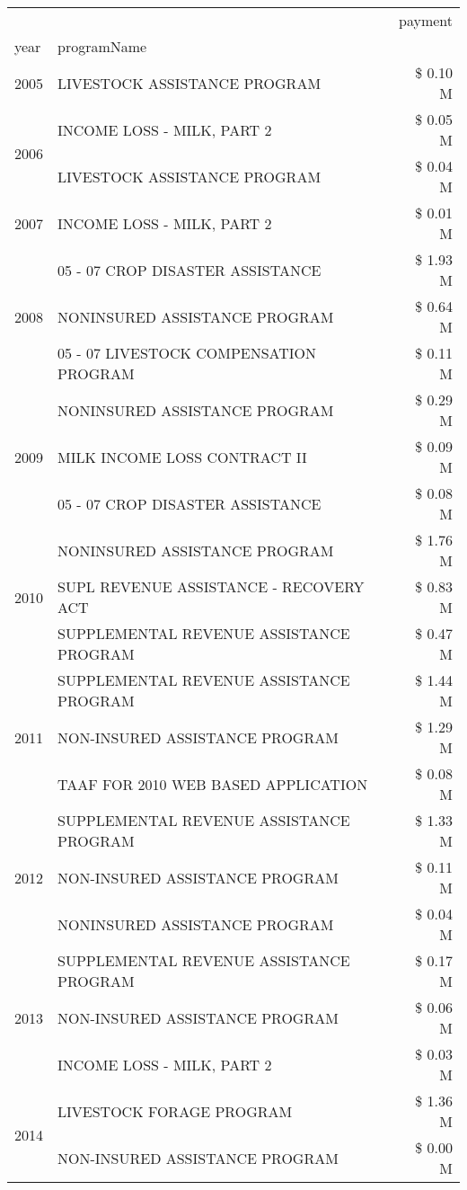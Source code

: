 \begin{tabular}{llr}
\toprule
 &  & payment \\
year & programName &  \\
\midrule
2005 & LIVESTOCK ASSISTANCE PROGRAM & \$ 0.10 M \\
\cline{1-3}
\multirow[t]{2}{*}{2006} & INCOME LOSS - MILK, PART 2 & \$ 0.05 M \\
 & LIVESTOCK ASSISTANCE PROGRAM & \$ 0.04 M \\
\cline{1-3}
2007 & INCOME LOSS - MILK, PART 2 & \$ 0.01 M \\
\cline{1-3}
\multirow[t]{3}{*}{2008} & 05 - 07 CROP DISASTER ASSISTANCE & \$ 1.93 M \\
 & NONINSURED ASSISTANCE PROGRAM & \$ 0.64 M \\
 & 05 - 07 LIVESTOCK COMPENSATION PROGRAM & \$ 0.11 M \\
\cline{1-3}
\multirow[t]{3}{*}{2009} & NONINSURED ASSISTANCE PROGRAM & \$ 0.29 M \\
 & MILK INCOME LOSS CONTRACT II & \$ 0.09 M \\
 & 05 - 07 CROP DISASTER ASSISTANCE & \$ 0.08 M \\
\cline{1-3}
\multirow[t]{3}{*}{2010} & NONINSURED ASSISTANCE PROGRAM & \$ 1.76 M \\
 & SUPL REVENUE ASSISTANCE - RECOVERY ACT & \$ 0.83 M \\
 & SUPPLEMENTAL REVENUE ASSISTANCE PROGRAM & \$ 0.47 M \\
\cline{1-3}
\multirow[t]{3}{*}{2011} & SUPPLEMENTAL REVENUE ASSISTANCE PROGRAM & \$ 1.44 M \\
 & NON-INSURED ASSISTANCE PROGRAM & \$ 1.29 M \\
 & TAAF FOR 2010 WEB BASED APPLICATION & \$ 0.08 M \\
\cline{1-3}
\multirow[t]{3}{*}{2012} & SUPPLEMENTAL REVENUE ASSISTANCE PROGRAM & \$ 1.33 M \\
 & NON-INSURED ASSISTANCE PROGRAM & \$ 0.11 M \\
 & NONINSURED ASSISTANCE PROGRAM & \$ 0.04 M \\
\cline{1-3}
\multirow[t]{3}{*}{2013} & SUPPLEMENTAL REVENUE ASSISTANCE PROGRAM & \$ 0.17 M \\
 & NON-INSURED ASSISTANCE PROGRAM & \$ 0.06 M \\
 & INCOME LOSS - MILK, PART 2 & \$ 0.03 M \\
\cline{1-3}
\multirow[t]{2}{*}{2014} & LIVESTOCK FORAGE PROGRAM & \$ 1.36 M \\
 & NON-INSURED ASSISTANCE PROGRAM & \$ 0.00 M \\

\end{tabular}
